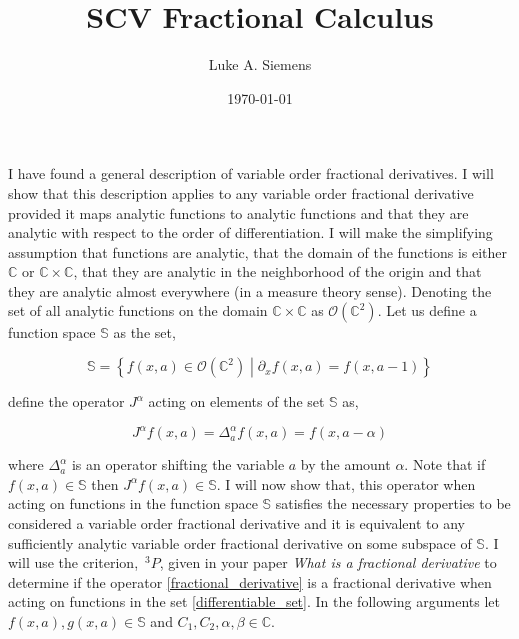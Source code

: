 \documentclass[%
 onecolumn,
 amsmath, amssymb, aps, pra, 10pt
]{revtex4-2}
\begin{document}
\title{SCV Fractional Calculus}%
\author{Luke A. Siemens}
\noaffiliation
\date{\today}
\maketitle

I have found a general description of variable order fractional derivatives. I will show that this description applies to any variable order fractional derivative provided it maps analytic functions to analytic functions and that they are analytic with respect to the order of differentiation. I will make the simplifying assumption that functions are analytic, that the domain of the functions is either $\mathbb{C}$ or $\mathbb{C} \times \mathbb{C}$, that they are analytic in the neighborhood of the origin and that they are analytic almost everywhere (in a measure theory sense). Denoting the set of all analytic functions on the domain $\mathbb{C} \times \mathbb{C}$ as $\mathcal{O}(\mathbb{C}^2)$. Let us define a function space $\mathbb{S}$ as the set,

\begin{equation}
\mathbb{S} = \left\lbrace f(x, a) \in \mathcal{O}(\mathbb{C}^2) \middle| \partial_x f(x, a) = f(x, a - 1) \right\rbrace
\label{differentiable_set}
\end{equation}

define the operator $J^{\alpha}$ acting on elements of the set $\mathbb{S}$ as,

\begin{equation}
J^{\alpha} f(x, a) = \Delta_{a}^{\alpha} f(x, a) = f(x, a - \alpha)
\label{fractional_derivative}
\end{equation}

where $\Delta_{a}^{\alpha}$ is an operator shifting the variable $a$ by the amount $\alpha$. Note that if $f(x, a) \in \mathbb{S}$ then $J^{\alpha} f(x, a) \in \mathbb{S}$. I will now show that, this operator when acting on functions in the function space $\mathbb{S}$ satisfies the necessary properties to be considered a variable order fractional derivative and it is equivalent to any sufficiently analytic variable order fractional derivative on some subspace of $\mathbb{S}$.
I will use the criterion, $\,^3P$, given in your paper \textit{What is a fractional derivative} \cite{ORTIGUEIRA20154} to determine if the operator \eqref{fractional_derivative} is a fractional derivative when acting on functions in the set \eqref{differentiable_set}. In the following arguments let $f(x, a), g(x, a) \in \mathbb{S}$ and $C_1, C_2, \alpha, \beta \in \mathbb{C}$.
\end{document}
